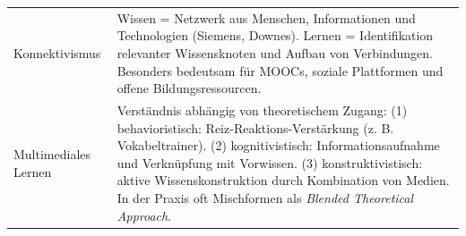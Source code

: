 {\begin{longtable}{p{3cm}p{8.25cm}}
    Konnektivismus & Wissen = Netzwerk aus Menschen, Informationen und Technologien (Siemens, Downes). Lernen = Identifikation relevanter Wissensknoten und Aufbau von Verbindungen. Besonders bedeutsam für MOOCs, soziale Plattformen und offene Bildungsressourcen. \\

    Multimediales Lernen & Verständnis abhängig von theoretischem Zugang: (1) behavioristisch: Reiz-Reaktions-Verstärkung (z. B. Vokabeltrainer). (2) kognitivistisch: Informationsaufnahme und Verknüpfung mit Vorwissen. (3) konstruktivistisch: aktive Wissenskonstruktion durch Kombination von Medien. In der Praxis oft Mischformen als \textit{Blended Theoretical Approach}. \\
\end{longtable}
}